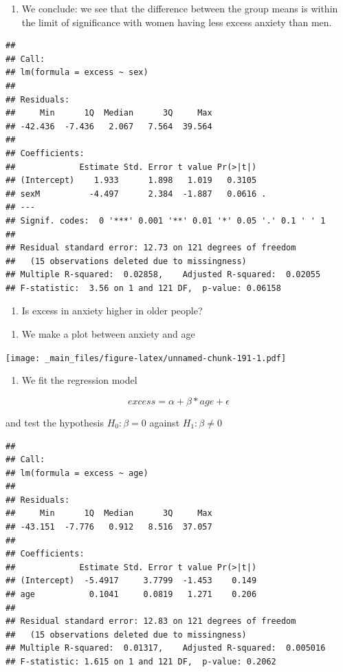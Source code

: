 \documentclass[
]{book}
\providecommand{\tightlist}{%
  \setlength{\itemsep}{0pt}\setlength{\parskip}{0pt}}
\begin{document}
\begin{enumerate}
\def\labelenumi{\alph{enumi}.}
\setcounter{enumi}{1}
\tightlist
\item
  We conclude: we see that the difference between the group means is within the limit of significance with women having less excess anxiety than men.
\end{enumerate}

\begin{verbatim}
## 
## Call:
## lm(formula = excess ~ sex)
## 
## Residuals:
##     Min      1Q  Median      3Q     Max 
## -42.436  -7.436   2.067   7.564  39.564 
## 
## Coefficients:
##             Estimate Std. Error t value Pr(>|t|)  
## (Intercept)    1.933      1.898   1.019   0.3105  
## sexM          -4.497      2.384  -1.887   0.0616 .
## ---
## Signif. codes:  0 '***' 0.001 '**' 0.01 '*' 0.05 '.' 0.1 ' ' 1
## 
## Residual standard error: 12.73 on 121 degrees of freedom
##   (15 observations deleted due to missingness)
## Multiple R-squared:  0.02858,    Adjusted R-squared:  0.02055 
## F-statistic:  3.56 on 1 and 121 DF,  p-value: 0.06158
\end{verbatim}

\begin{enumerate}
\def\labelenumi{\arabic{enumi}.}
\setcounter{enumi}{3}
\tightlist
\item
  Is excess in anxiety higher in older people?
\end{enumerate}

\begin{enumerate}
\def\labelenumi{\alph{enumi}.}
\tightlist
\item
  We make a plot between anxiety and age
\end{enumerate}

\texttt{[image: \_main\_files/figure-latex/unnamed-chunk-191-1.pdf]}

\begin{enumerate}
\def\labelenumi{\alph{enumi}.}
\setcounter{enumi}{1}
\tightlist
\item
  We fit the regression model
\end{enumerate}

\[excess = \alpha + \beta * age + \epsilon\]

and test the hypothesis \(H_0: \beta=0\) against \(H_1: \beta\neq 0\)

\begin{verbatim}
## 
## Call:
## lm(formula = excess ~ age)
## 
## Residuals:
##     Min      1Q  Median      3Q     Max 
## -43.151  -7.776   0.912   8.516  37.057 
## 
## Coefficients:
##             Estimate Std. Error t value Pr(>|t|)
## (Intercept)  -5.4917     3.7799  -1.453    0.149
## age           0.1041     0.0819   1.271    0.206
## 
## Residual standard error: 12.83 on 121 degrees of freedom
##   (15 observations deleted due to missingness)
## Multiple R-squared:  0.01317,    Adjusted R-squared:  0.005016 
## F-statistic: 1.615 on 1 and 121 DF,  p-value: 0.2062
\end{verbatim}
\end{document}
